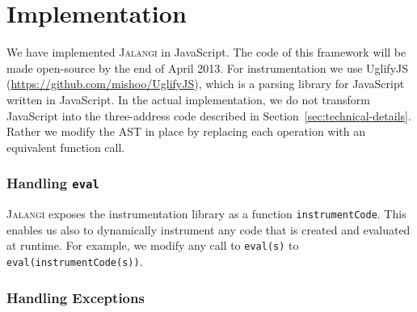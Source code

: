 \documentclass{sig-alternate}
\def\jalangi{\textsc{Jalangi}}
\newcommand \usl [1] {\mbox{\underline{\tt #1}}\xspace}
\newcommand \analysis{\usl{anlys}}
\begin{document}


\section{Implementation}
\label{sec:implementation}

We have implemented \jalangi{} in JavaScript.  The code of this
framework will be made open-source by the end of April 2013.  For
instrumentation we use UglifyJS
(\url{https://github.com/mishoo/UglifyJS}), which is a parsing library
for JavaScript written in JavaScript.  In the actual implementation,
we do not transform JavaScript into the three-address code described
in Section~\ref{sec:technical-details}.  Rather we modify the AST in
place by replacing each operation with an equivalent function call.

\subsubsection*{Handling \texttt{eval}}
\label{sec:handling-texttteval}

\jalangi{} exposes the instrumentation
library as a function \texttt{instrumentCode}.  This enables us also
to dynamically instrument any code that is created and evaluated at
runtime.  For example, we modify any call to \texttt{eval(s)} to
\texttt{eval(instrumentCode(s))}.

\subsubsection*{Handling Exceptions}
\label{sec:handling-exceptions}
\end{document}
